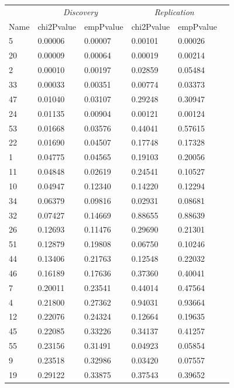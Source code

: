 \begin{table}[ht]
\centering
\setlength{\extrarowheight}{2pt}
\begin{tabular}{llllll}
  \toprule
   &  \multicolumn{2}{c}{\textit{Discovery}} & \multicolumn{2}{c}{\textit{Replication}} \\
   \cmidrule{2-5}
 Name & chi2Pvalue  & empPvalue  & chi2Pvalue   & empPvalue   \\ 
  \midrule
5 & 0.00006 & 0.00007 & 0.00101 & 0.00026 \\ 
  20 & 0.00009 & 0.00064 & 0.00019 & 0.00214 \\ 
  2 & 0.00010 & 0.00197 & 0.02859 & 0.05484 \\ 
  33 & 0.00033 & 0.00351 & 0.00774 & 0.03373 \\ 
  47 & 0.01040 & 0.03107 & 0.29248 & 0.30947 \\ 
  24 & 0.01135 & 0.00904 & 0.00121 & 0.00124 \\ 
  53 & 0.01668 & 0.03576 & 0.44041 & 0.57615 \\ 
  22 & 0.01690 & 0.04507 & 0.17748 & 0.17328 \\ 
  1 & 0.04775 & 0.04565 & 0.19103 & 0.20056 \\ 
  11 & 0.04848 & 0.02619 & 0.24541 & 0.10527 \\ 
  10 & 0.04947 & 0.12340 & 0.14220 & 0.12294 \\ 
  34 & 0.06379 & 0.09816 & 0.02931 & 0.08681 \\ 
  32 & 0.07427 & 0.14669 & 0.88655 & 0.88639 \\ 
  26 & 0.12693 & 0.11476 & 0.29690 & 0.21301 \\ 
  51 & 0.12879 & 0.19808 & 0.06750 & 0.10246 \\ 
  44 & 0.13406 & 0.21763 & 0.12548 & 0.22032 \\ 
  46 & 0.16189 & 0.17636 & 0.37360 & 0.40041 \\ 
  7 & 0.20011 & 0.23541 & 0.44014 & 0.47564 \\ 
  4 & 0.21800 & 0.27362 & 0.94031 & 0.93664 \\ 
  12 & 0.22076 & 0.24324 & 0.12664 & 0.19635 \\ 
  45 & 0.22085 & 0.33226 & 0.34137 & 0.41257 \\ 
  55 & 0.23156 & 0.31491 & 0.04923 & 0.05854 \\ 
  9 & 0.23518 & 0.32986 & 0.03420 & 0.07557 \\ 
  19 & 0.29122 & 0.33875 & 0.37543 & 0.39652 \\ 

\end{tabular}
\end{table}
